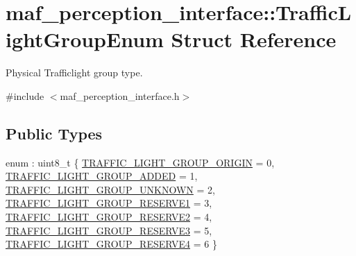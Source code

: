 \hypertarget{structmaf__perception__interface_1_1TrafficLightGroupEnum}{}\section{maf\+\_\+perception\+\_\+interface\+:\+:Traffic\+Light\+Group\+Enum Struct Reference}
\label{structmaf__perception__interface_1_1TrafficLightGroupEnum}


Physical Trafficlight group type.  




{\ttfamily \#include $<$maf\+\_\+perception\+\_\+interface.\+h$>$}

\subsection*{Public Types}
\begin{DoxyCompactItemize}
\item 
enum \+: uint8\+\_\+t \{ \newline
\hyperlink{structmaf__perception__interface_1_1TrafficLightGroupEnum_a85bee6ced664e05589dc5067e5a483eaaff73b93ca8d3265b81a516c14968734d}{T\+R\+A\+F\+F\+I\+C\+\_\+\+L\+I\+G\+H\+T\+\_\+\+G\+R\+O\+U\+P\+\_\+\+O\+R\+I\+G\+IN} = 0, 
\hyperlink{structmaf__perception__interface_1_1TrafficLightGroupEnum_a85bee6ced664e05589dc5067e5a483eaa4c9800b02a708463d186ce2a82e2c5af}{T\+R\+A\+F\+F\+I\+C\+\_\+\+L\+I\+G\+H\+T\+\_\+\+G\+R\+O\+U\+P\+\_\+\+A\+D\+D\+ED} = 1, 
\hyperlink{structmaf__perception__interface_1_1TrafficLightGroupEnum_a85bee6ced664e05589dc5067e5a483eaa4cdb7a656b732750e84103247745a761}{T\+R\+A\+F\+F\+I\+C\+\_\+\+L\+I\+G\+H\+T\+\_\+\+G\+R\+O\+U\+P\+\_\+\+U\+N\+K\+N\+O\+WN} = 2, 
\hyperlink{structmaf__perception__interface_1_1TrafficLightGroupEnum_a85bee6ced664e05589dc5067e5a483eaa557d8ce47367ccc8824d0dd1e69fb98d}{T\+R\+A\+F\+F\+I\+C\+\_\+\+L\+I\+G\+H\+T\+\_\+\+G\+R\+O\+U\+P\+\_\+\+R\+E\+S\+E\+R\+V\+E1} = 3, 
\newline
\hyperlink{structmaf__perception__interface_1_1TrafficLightGroupEnum_a85bee6ced664e05589dc5067e5a483eaae2d1d464e2689e58fd601d5a20616837}{T\+R\+A\+F\+F\+I\+C\+\_\+\+L\+I\+G\+H\+T\+\_\+\+G\+R\+O\+U\+P\+\_\+\+R\+E\+S\+E\+R\+V\+E2} = 4, 
\hyperlink{structmaf__perception__interface_1_1TrafficLightGroupEnum_a85bee6ced664e05589dc5067e5a483eaafa0da25920a8e9fb7001a1f2b87a38a4}{T\+R\+A\+F\+F\+I\+C\+\_\+\+L\+I\+G\+H\+T\+\_\+\+G\+R\+O\+U\+P\+\_\+\+R\+E\+S\+E\+R\+V\+E3} = 5, 
\hyperlink{structmaf__perception__interface_1_1TrafficLightGroupEnum_a85bee6ced664e05589dc5067e5a483eaa6fa5bceca0e473ca41aadf82553279e1}{T\+R\+A\+F\+F\+I\+C\+\_\+\+L\+I\+G\+H\+T\+\_\+\+G\+R\+O\+U\+P\+\_\+\+R\+E\+S\+E\+R\+V\+E4} = 6
 \}
\end{DoxyCompactItemize}
